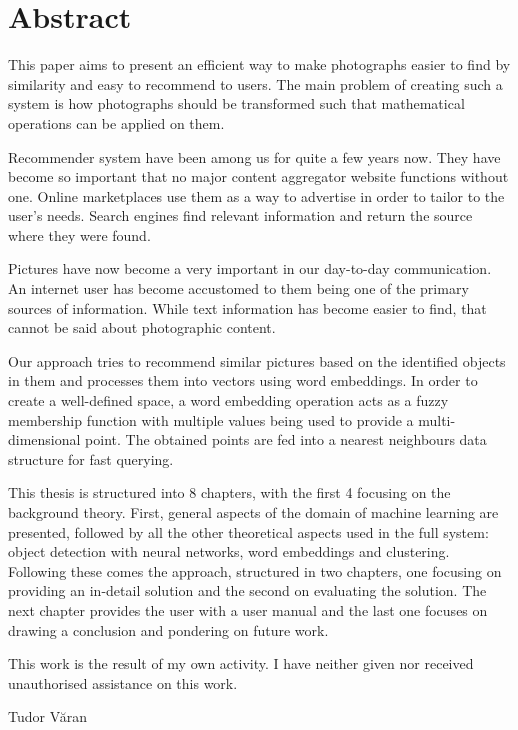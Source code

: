 \chapter*{Abstract}
\thispagestyle{empty}
\addtocounter{page}{-1}

This paper aims to present an efficient way to make photographs easier to find by similarity and easy to recommend to users. The main problem of creating such a system is how photographs should be transformed such that mathematical operations can be applied on them.

Recommender system have been among us for quite a few years now. They have become so important that no major content aggregator website functions without one. Online marketplaces use them as a way to advertise in order to tailor to the user's needs. Search engines find relevant information and return the source where they were found.

Pictures have now become a very important in our day-to-day communication. An internet user has become accustomed to them being one of the primary sources of information. While text information has become easier to find, that cannot be said about photographic content.

Our approach tries to recommend similar pictures based on the identified objects in them and processes them into vectors using word embeddings. In order to create a well-defined space, a word embedding operation acts as a fuzzy membership function with multiple values being used to provide a multi-dimensional point. The obtained points are fed into a nearest neighbours data structure for fast querying.

This thesis is structured into 8 chapters, with the first 4 focusing on the background theory. First, general aspects of the domain of machine learning are presented, followed by all the other theoretical aspects used in the full system: object detection with neural networks, word embeddings and clustering. Following these comes the approach, structured in two chapters, one focusing on providing an in-detail solution and the second on evaluating the solution. The next chapter provides the user with a user manual and the last one focuses on drawing a conclusion and pondering on future work.

This work is the result of my own activity. I have neither given nor received unauthorised assistance on this work.

\begin{flushright}
Tudor V\u{a}ran
\end{flushright}
